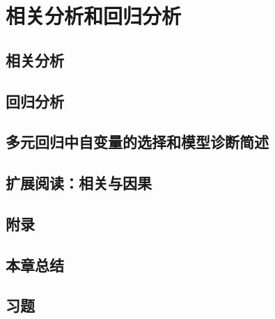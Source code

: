 \setcounter{chapter}{9} %
\chapter{相关分析和回归分析}
\label{chap:study-correlation-regression}

\section{相关分析}
\label{sec:study-correlation}

\section{回归分析}
\label{sec:study-regression}

\section{多元回归中自变量的选择和模型诊断简述}
\label{sec:study-regression-diagnostics}

\section{扩展阅读：相关与因果}
\label{sec:study-correlation-causation}

\section{附录}
\label{sec:study-regression-appendix}

\section*{本章总结}

\section*{习题}



